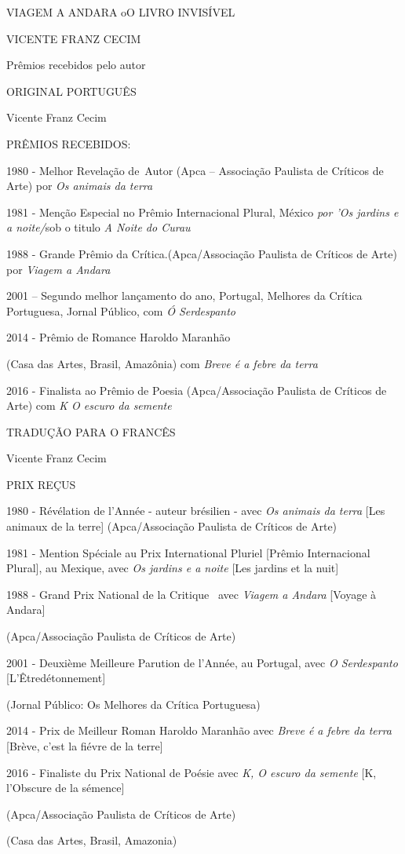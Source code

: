 VIAGEM A ANDARA oO LIVRO INVISÍVEL

VICENTE FRANZ CECIM

Prêmios recebidos pelo autor

ORIGINAL PORTUGUÊS

Vicente Franz Cecim

PRÊMIOS RECEBIDOS:

1980 - Melhor Revelação de~Autor (Apca -- Associação Paulista de
Críticos de Arte) por \emph{Os animais da terra}

1981 - Menção Especial no Prêmio Internacional Plural, México \emph{por
'Os jardins e a noite/}sob o titulo \emph{A Noite do Curau}

1988 - Grande Prêmio da Crítica.(Apca/Associação Paulista de Críticos de
Arte) por \emph{Viagem a Andara}

2001 -- Segundo melhor lançamento do ano, Portugal, Melhores da Crítica
Portuguesa, Jornal Público, com \emph{Ó Serdespanto}

2014 - Prêmio de Romance Haroldo Maranhão

(Casa das Artes, Brasil, Amazônia) com \emph{Breve é a febre da terra}

2016 - Finalista ao Prêmio de Poesia (Apca/Associação Paulista de
Críticos de Arte) com \emph{K O escuro da semente}

TRADUÇÃO PARA O FRANCÊS

Vicente Franz Cecim

PRIX REÇUS

1980 - Révélation de l'Année - auteur brésilien - avec \emph{Os animais
da terra} {[}Les animaux de la terre{]} (Apca/Associação Paulista de
Críticos de Arte)

1981 - Mention Spéciale au Prix International Pluriel {[}Prêmio
Internacional Plural{]}, au Mexique, avec \emph{Os jardins e a noite}
{[}Les jardins et la nuit{]}

1988 - Grand Prix National de la Critique~ avec \emph{Viagem a Andara}
{[}Voyage à Andara{]}

(Apca/Associação Paulista de Críticos de Arte)

2001 - Deuxième Meilleure Parution de l'Année, au Portugal, avec \emph{O
Serdespanto} {[}L'Êtredétonnement{]}

(Jornal Público: Os Melhores da Crítica Portuguesa)

2014 - Prix de Meilleur Roman Haroldo Maranhão avec \emph{Breve é a
febre da terra}~ {[}Brève, c'est la fiévre de la terre{]}

2016 - Finaliste du Prix National de Poésie avec \emph{K, O escuro da
semente} {[}K, l'Obscure de la sémence{]}

(Apca/Associação Paulista de Críticos de Arte)

(Casa das Artes, Brasil, Amazonia)
